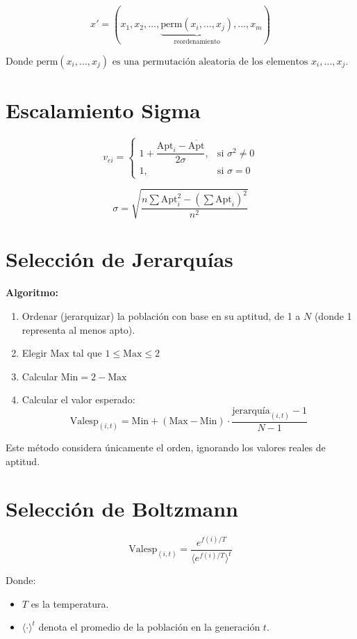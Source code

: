 \documentclass[11pt, letterpaper]{article}
\begin{document}
\[
x' = (x_1, x_2, \ldots, \underbrace{\text{perm}(x_i, \ldots, x_j)}_{\text{reordenamiento}}, \ldots, x_m)
\]

$\text{Donde } \text{perm}(x_i, \ldots, x_j) \text{ es una permutación aleatoria de los elementos } x_i, \ldots, x_j.$



\section*{Escalamiento Sigma}

\[
v_{ei} =
\begin{cases}
	1 + \dfrac{\text{Apt}_i - \overline{\text{Apt}}}{2\sigma}, & \text{si } \sigma^2 \neq 0 \\
	1, & \text{si } \sigma = 0
\end{cases}
\]

\[
\sigma = \sqrt{ \dfrac{n \sum \text{Apt}_i^2 - \left( \sum \text{Apt}_i \right)^2}{n^2} }
\]

\section*{Selección de Jerarquías}

\textbf{Algoritmo:}
\begin{enumerate}
	\item Ordenar (jerarquizar) la población con base en su aptitud, de 1 a \( N \) (donde 1 representa al menos apto).
	\item Elegir \( \text{Max} \) tal que \( 1 \leq \text{Max} \leq 2 \)
	\item Calcular \( \text{Min} = 2 - \text{Max} \)
	\item Calcular el valor esperado:
	\[
	\text{Valesp}_{(i,t)} = \text{Min} + (\text{Max} - \text{Min}) \cdot \dfrac{\text{jerarquía}_{(i,t)} - 1}{N - 1}
	\]
\end{enumerate}

Este método considera únicamente el orden, ignorando los valores reales de aptitud.

\section*{Selección de Boltzmann}

\[
\text{Valesp}_{(i,t)} = \dfrac{e^{f(i)/T}}{ \langle e^{f(i)/T} \rangle^t }
\]

Donde:
\begin{itemize}
	\item \( T \) es la temperatura.
	\item \( \langle \cdot \rangle^t \) denota el promedio de la población en la generación \( t \).
\end{itemize}
\end{document}
